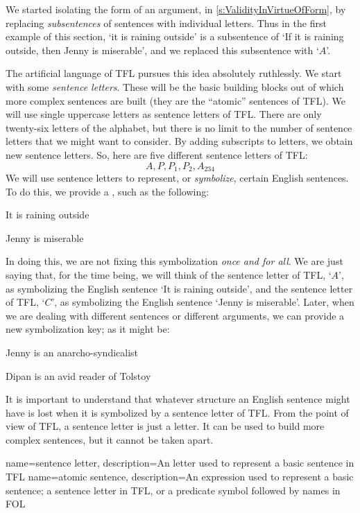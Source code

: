 We started isolating the form of an argument, in \cref{s:ValidityInVirtueOfForm}, by replacing \emph{subsentences} of sentences with individual letters. Thus in the first example of this section, `it is raining outside' is a subsentence of `If it is raining outside, then Jenny is miserable', and we replaced this subsentence with `$A$'.

The artificial language of TFL pursues this idea absolutely
ruthlessly. We start with some \emph{sentence letters}. These will be
the basic building blocks out of which more complex sentences are
built (they are the ``atomic'' sentences of TFL). We will use single
uppercase letters as sentence letters of TFL. There are only
twenty-six letters of the alphabet, but there is no limit to the
number of sentence letters that we might want to consider. By adding
subscripts to letters, we obtain new sentence letters. So, here are
five different sentence letters of TFL:
	$$A, P, P_1, P_2, A_{234}$$
We will use sentence letters to represent, or \emph{symbolize}, certain English sentences. To do this, we provide a , such as the following:
	\begin{ekey}
		\item[A] It is raining outside
		\item[C] Jenny is miserable
	\end{ekey}
In doing this, we are not fixing this symbolization \emph{once and for all}. We are just saying that, for the time being, we will think of the sentence letter of TFL, `$A$', as symbolizing the English sentence `It is raining outside', and the sentence letter of TFL, `$C$', as symbolizing the English sentence `Jenny is miserable'. Later, when we are dealing with different sentences or different arguments, we can provide a new symbolization key; as it might be:
	\begin{ekey}
		\item[A] Jenny is an anarcho-syndicalist
		\item[C] Dipan is an avid reader of Tolstoy
	\end{ekey}
It is important to understand that whatever structure an English sentence might have is lost when it is symbolized by a sentence letter of TFL. From the point of view of TFL, a sentence letter is just a letter. It can be used to build more complex sentences, but it cannot be taken apart.

{
name=sentence letter,
description={An letter used to represent a basic sentence in TFL}
}
{
name=atomic sentence,
description={An expression used to represent a basic sentence; a sentence letter in TFL, or a predicate symbol followed by names in FOL}
}

